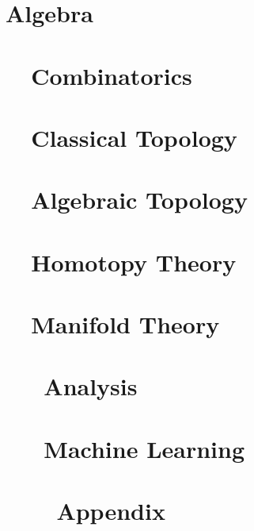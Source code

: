 

\part{Algebra}





\part{~~Combinatorics}



\part{~~Classical Topology}



\part{~~Algebraic Topology}



\part{~~Homotopy Theory}



\part{~~Manifold Theory}



\part{~~~Analysis}



\part{~~~Machine Learning}



\appendix

\part{~~~~Appendix}




\printbibliography


